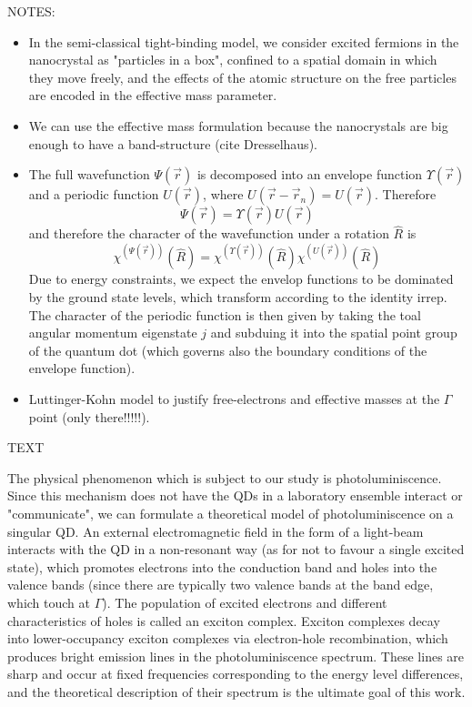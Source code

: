 NOTES:
\begin{itemize}
\item In the semi-classical tight-binding model, we consider excited fermions in the nanocrystal as "particles in a box", confined to a spatial domain in which they move freely, and the effects of the atomic structure on the free particles are encoded in the effective mass parameter.
\item We can use the effective mass formulation because the nanocrystals are big enough to have a band-structure (cite Dresselhaus).
\item The full wavefunction $\Psi\left(\vec{r}\right)$ is decomposed into an envelope function $\Upsilon\left(\vec{r}\right)$ and a periodic function $U\left(\vec{r}\right)$, where $U\left(\vec{r}-\vec{r}_n\right)=U\left(\vec{r}\right)$. Therefore
$$\Psi\left(\vec{r}\right)=\Upsilon\left(\vec{r}\right)U\left(\vec{r}\right)$$
and therefore the character of the wavefunction under a rotation $\hat{R}$ is
$$\chi^{\left(\Psi\left(\vec{r}\right)\right)}\left(\hat{R}\right)=\chi^{\left(\Upsilon\left(\vec{r}\right)\right)}\left(\hat{R}\right)\chi^{\left(U\left(\vec{r}\right)\right)}\left(\hat{R}\right)$$
Due to energy constraints, we expect the envelop functions to be dominated by the ground state levels, which transform according to the identity irrep. The character of the periodic function is then given by taking the toal angular momentum eigenstate $j$ and subduing it into the spatial point group of the quantum dot (which governs also the boundary conditions of the envelope function).
\item Luttinger-Kohn model to justify free-electrons and effective masses at the $\Gamma$ point (only there!!!!!).
\end{itemize}

TEXT

The physical phenomenon which is subject to our study is photoluminiscence. Since this mechanism does not have the QDs in a laboratory ensemble interact or "communicate", we can formulate a theoretical model of photoluminiscence on a singular QD. An external electromagnetic field in the form of a light-beam interacts with the QD in a non-resonant way (as for not to favour a single excited state), which promotes electrons into the conduction band and holes into the valence bands (since there are typically two valence bands at the band edge, which touch at $\Gamma$). The population of excited electrons and different characteristics of holes is called an exciton complex. Exciton complexes decay into lower-occupancy exciton complexes via electron-hole recombination, which produces bright emission lines in the photoluminiscence spectrum. These lines are sharp and occur at fixed frequencies corresponding to the energy level differences, and the theoretical description of their spectrum is the ultimate goal of this work.

